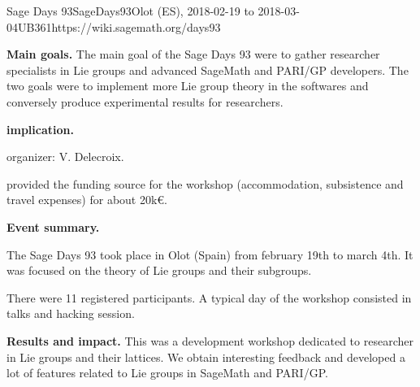 \begin{event}{Sage Days 93}{SageDays93}{Olot (ES),
2018-02-19 to 2018-03-04}{UB}{36}{1}{https://wiki.sagemath.org/days93}

\textbf{Main goals.}
The main goal of the Sage Days 93 were to
gather researcher specialists in Lie groups and advanced
SageMath and PARI/GP developers. The two goals were to implement
more Lie group theory in the softwares and conversely produce
experimental results for researchers.


\textbf{\ODK implication.}

\ODK organizer: V. Delecroix.

\ODK provided the funding source for the workshop (accommodation,
subsistence and travel expenses) for about 20k\euro.

\textbf{Event summary.}

The Sage Days 93 took place in Olot (Spain) from february 19th to
march 4th. It was focused on the theory of Lie groups and their
subgroups.

There were 11 registered participants. A typical day of the workshop
consisted in talks and hacking session.

\textbf{Results and impact.}
This was a development workshop dedicated to researcher in Lie groups
and their lattices. We obtain interesting feedback and developed
a lot of features related to Lie groups in SageMath and PARI/GP.
\end{event}
